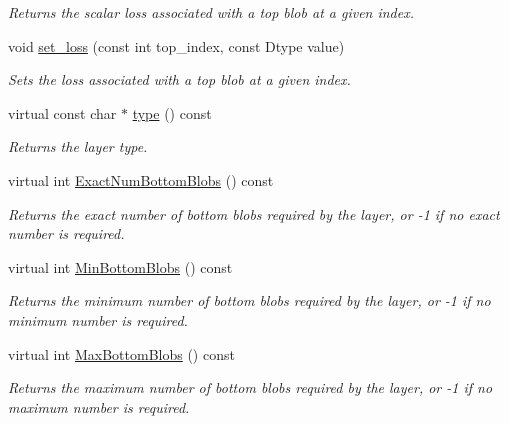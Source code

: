 \begin{DoxyCompactItemize}
\begin{DoxyCompactList}\small\item\em Returns the scalar loss associated with a top blob at a given index. \end{DoxyCompactList}\item 
\mbox{\label{classcaffe_1_1_layer_a899b09f4b91ada8545b3a43ee91e0d69}} 
void \mbox{\hyperlink{classcaffe_1_1_layer_a899b09f4b91ada8545b3a43ee91e0d69}{set\+\_\+loss}} (const int top\+\_\+index, const Dtype value)
\begin{DoxyCompactList}\small\item\em Sets the loss associated with a top blob at a given index. \end{DoxyCompactList}\item 
\mbox{\label{classcaffe_1_1_layer_a8952bff6bc4c2a96d8ea30d8ff65b198}} 
virtual const char $\ast$ \mbox{\hyperlink{classcaffe_1_1_layer_a8952bff6bc4c2a96d8ea30d8ff65b198}{type}} () const
\begin{DoxyCompactList}\small\item\em Returns the layer type. \end{DoxyCompactList}\item 
virtual int \mbox{\hyperlink{classcaffe_1_1_layer_a8e5ee0494d85f5f55fc4396537cbc60f}{Exact\+Num\+Bottom\+Blobs}} () const
\begin{DoxyCompactList}\small\item\em Returns the exact number of bottom blobs required by the layer, or -\/1 if no exact number is required. \end{DoxyCompactList}\item 
virtual int \mbox{\hyperlink{classcaffe_1_1_layer_aca3cb2bafaefda5d4760aaebd0b72def}{Min\+Bottom\+Blobs}} () const
\begin{DoxyCompactList}\small\item\em Returns the minimum number of bottom blobs required by the layer, or -\/1 if no minimum number is required. \end{DoxyCompactList}\item 
virtual int \mbox{\hyperlink{classcaffe_1_1_layer_af8bdc989053e0363ab032026b46de7c3}{Max\+Bottom\+Blobs}} () const
\begin{DoxyCompactList}\small\item\em Returns the maximum number of bottom blobs required by the layer, or -\/1 if no maximum number is required. \end{DoxyCompactList}\item 

\end{DoxyCompactItemize}
